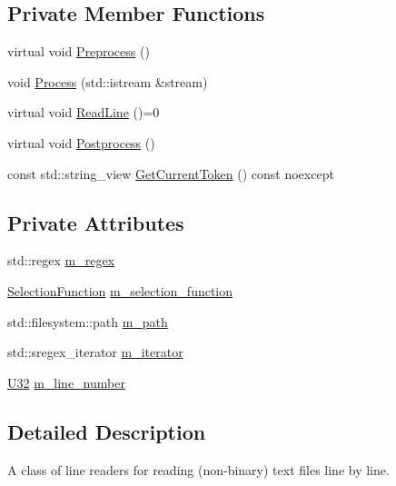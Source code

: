 \subsection*{Private Member Functions}
\begin{DoxyCompactItemize}
\item 
virtual void \mbox{\hyperlink{classmage_1_1_line_reader_ad81a84bf9ecd81b9a391698afbd5eb61}{Preprocess}} ()
\item 
void \mbox{\hyperlink{classmage_1_1_line_reader_ad351b7c68e5784d0dca690a5b8fe7528}{Process}} (std\+::istream \&stream)
\item 
virtual void \mbox{\hyperlink{classmage_1_1_line_reader_a8c81989a9d59ae31dd19e6d3961cfaf1}{Read\+Line}} ()=0
\item 
virtual void \mbox{\hyperlink{classmage_1_1_line_reader_a51775e07b5f7c9f72441e42d6d3896e1}{Postprocess}} ()
\item 
const std\+::string\+\_\+view \mbox{\hyperlink{classmage_1_1_line_reader_a543a1b133b0067cbe69e81dbad5ea0e1}{Get\+Current\+Token}} () const noexcept
\end{DoxyCompactItemize}
\subsection*{Private Attributes}
\begin{DoxyCompactItemize}
\item 
std\+::regex \mbox{\hyperlink{classmage_1_1_line_reader_a2b3c9c2f693971765c03db3752edc339}{m\+\_\+regex}}
\item 
\mbox{\hyperlink{classmage_1_1_line_reader_a17bbae61a3ce30bdb251d6c76e1a4522}{Selection\+Function}} \mbox{\hyperlink{classmage_1_1_line_reader_a69f3eac618227e43eb7d55aec475d2ff}{m\+\_\+selection\+\_\+function}}
\item 
std\+::filesystem\+::path \mbox{\hyperlink{classmage_1_1_line_reader_a05436c40af16b882c2ebd515287598f7}{m\+\_\+path}}
\item 
std\+::sregex\+\_\+iterator \mbox{\hyperlink{classmage_1_1_line_reader_a106f89e663b174b5b55bfdf79fbca901}{m\+\_\+iterator}}
\item 
\mbox{\hyperlink{namespacemage_aa5d6eaabaac3cdd01873d6a3d27e90f3}{U32}} \mbox{\hyperlink{classmage_1_1_line_reader_ab145590a7e115106c0987905fde98393}{m\+\_\+line\+\_\+number}}
\end{DoxyCompactItemize}


\subsection{Detailed Description}
A class of line readers for reading (non-\/binary) text files line by line. 

